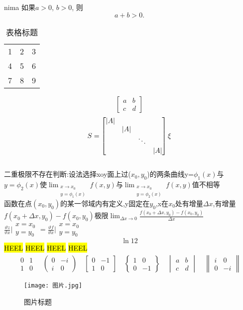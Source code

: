 \documentclass{article}
\begin{document}
nima
如果$a>0$, $b>0$, 则
$$
a+b>0.
$$
\begin{table}[htbp]
    \centering
    \caption{表格标题}
    \begin{tabular}{ccc}
        1 & 2 & 3 \\
        4 & 5 & 6 \\
        7 & 8 & 9
    \end{tabular}
\end{table}
$$
\begin{bmatrix}
    a & b \\
    c & d
\end{bmatrix}
$$
$$
S=
\begin{bmatrix}
|A| &  &    &  \\
  & |A|  &   &   \\
  &  & \ddots   &  \\
  &   &  & |A|  \\
\end{bmatrix}
\newline
\xi 
$$
\\
二重极限不存在判断:设法选择xoy面上过($x_0, y_0$)的两条曲线y=$\phi_1(x)$与$y=\phi_2(x)$使$\lim_{\substack{x \to x_0\\y=\phi_1(x)}}f(x,y)$与$\lim_{\substack{x \to x_0\\y=\phi_2(x)}}f(x,y)$值不相等
\\
函数在点$(x_0,y_0)$的某一邻域内有定义,y固定在$y_0$,x在$x_0$处有增量$\Delta x$,有增量$f(x_0+\Delta x,y_0)-f(x_0,y_0)$极限$\lim_{\Delta x \to 0}\frac{f(x_0 + \Delta x, y_0)-f(x_0,y_0)}{\Delta x}$
\\
$\frac{\vartheta z}{\vartheta x}\lvert{\substack{x= x_0\\y= y_0}}=\frac{\vartheta f}{\vartheta x}\lvert{\substack{x= x_0\\y= y_0}}$
\\
$$\ln{12}$$
\hl{HEEL}
\hl{HEEL}
\hl{HEEL} %
\hl{HEEL}
\begin{equation}
	\begin{gathered}
	\begin{matrix} 0 & 1 \\ 1 & 0 \end{matrix}
	\quad
	\begin{pmatrix} 0 & -i \\ i & 0 \end{pmatrix}
	\quad
	\begin{bmatrix} 0 & -1 \\ 1 & 0 \end{bmatrix}
	\quad
	\begin{Bmatrix} 1 & 0 \\ 0 & -1 \end{Bmatrix}
	\quad
	\begin{vmatrix} a & b \\ c & d \end{vmatrix}
	\quad
	\begin{Vmatrix} i & 0 \\ 0 & -i \end{Vmatrix}
	\end{gathered}
\end{equation}
\begin{figure}[htbp]
    \centering
    \texttt{[image: 图片.jpg]}
    \caption{图片标题}
\end{figure}
\end{document}
